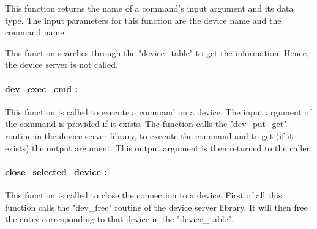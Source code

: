This function returns the name of a command's input argument and its data type.
The input parameters for this function are the device name and the command
name.

This function searches through the "device\_table" to get the information. 
Hence, the device server is not called.


\paragraph{dev\_exec\_cmd : }

This function is called to execute a command on a device. The input argument
of the command is provided if it exists. The function calls the
"dev\_put\_get" routine in the device server library, to execute the command
and to get (if it exists) the output argument. This output argument is then
returned to the caller.


\paragraph{close\_selected\_device : }

This function is called to close the connection to a device. First of all this
function calls the "dev\_free" routine of the device server library. It will 
then free the entry corresponding to that device in the "device\_table".


